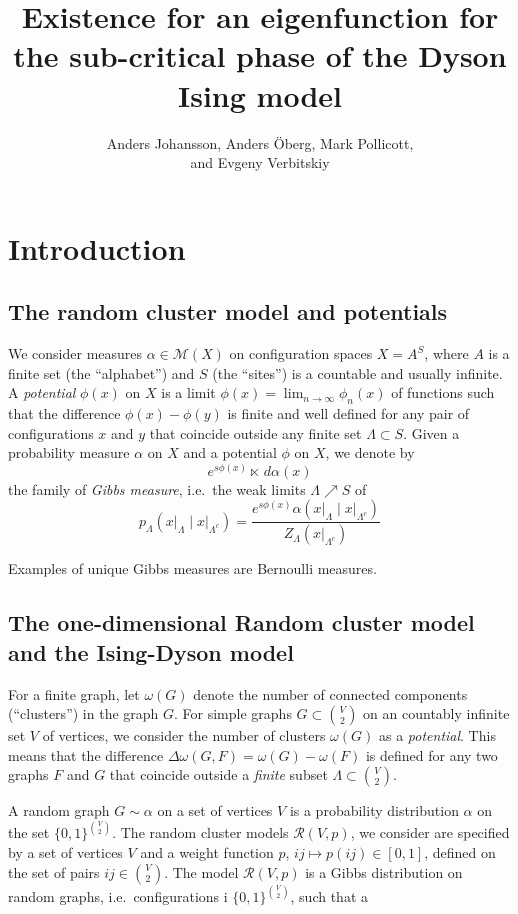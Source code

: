 \documentclass[11pt, a4paper, oneside]{article}
\title{Existence for an eigenfunction for the sub-critical phase of the Dyson
  Ising model\langle{}\rangle}
\author{Anders Johansson, Anders \"Oberg, Mark Pollicott, \\ and Evgeny Verbitskiy}
\date{}
\theoremstyle{definition}
\theoremstyle{remark}
\renewcommand{\d}{\,d}
\providecommand{\mscr}{\mathscr}
\providecommand{\w}{\omega}
\begin{document}
\maketitle


\section{Introduction}\noindent


\def\gibb{\dot\ltimes} \def\gibbs{\ltimes}

\subsection{The random cluster model and potentials}

We consider measures $\alpha \in \mscr M(X)$ on configuration spaces $X = A^S$,
where $A$ is a finite set (the ``alphabet'') and $S$ (the ``sites'') is a
countable and usually infinite. A \emph{potential} $\phi(x)$ on $X$ is a limit
$\phi(x) = \lim_{n\to\infty}\phi_n(x)$ of functions such that the difference
$\phi(x)-\phi(y)$ is finite and well defined for any pair of configurations $x$
and $y$ that coincide outside any finite set $\Lambda\subset S$. Given a
probability measure $\alpha$ on $X$ and a potential $\phi$ on $X$, we denote by
\[
  e^{s\phi(x)} \gibbs \d\alpha(x)
\]
the family of \emph{Gibbs measure}, i.e.\ the weak limits $\Lambda\nearrow S$ of
\[
  p_\Lambda(x\vert_\Lambda\mid x\vert_{\Lambda^c}) = \frac {e^{s\phi(x)}\alpha(x\vert_{\Lambda}\mid x\vert_{\Lambda^c})} {Z_\Lambda(x\vert_{\Lambda^c})}
\]

Examples of unique Gibbs measures are Bernoulli measures.

\subsection{The one-dimensional Random cluster model and the Ising-Dyson model}

For a finite graph, let $\w(G)$ denote the number of connected components
(``clusters'') in the graph $G$. For simple graphs $G\subset \binom V2$ on an
countably infinite set $V$ of vertices, we consider the number of clusters
$\w(G)$ as a \emph{potential}. This means that the difference
$\Delta\w(G,F) = \w(G)-\w(F)$ is defined for any two graphs $F$ and $G$ that
coincide outside a \emph{finite} subset $\Lambda\subset \binom V2$.

A random graph $G\sim\alpha$ on a set of vertices $V$ is a probability
distribution $\alpha$ on the set $\{0,1\}^{\binom V2}$. The random cluster
models $\mscr R(V,p)$, we consider are specified by a set of vertices $V$ and a
weight function $p$, $ij\mapsto p(ij)\in[0,1]$, defined on the set of pairs
$ij\in \binom V2$. The model $\mscr R(V,p)$ is a Gibbs distribution on random
graphs, i.e.\ configurations i $\{0,1\}^{\binom V2}$, such that a
\end{document}
